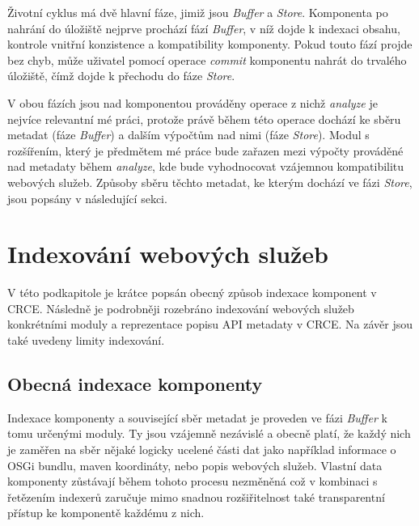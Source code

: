 \documentclass[czech,DP]{thesiskiv}
\begin{document}
Životní cyklus má dvě hlavní fáze, jimiž jsou \textit{Buffer} a \textit{Store}. Komponenta po nahrání do úložiště nejprve prochází fází \textit{Buffer}, v níž dojde k indexaci obsahu, kontrole vnitřní konzistence a kompatibility komponenty. Pokud touto fází projde bez chyb, může uživatel pomocí operace \textit{commit} komponentu nahrát do trvalého úložiště, čímž dojde k přechodu  do fáze \textit{Store}.

V obou fázích jsou nad komponentou prováděny operace z nichž \textit{analyze} je nejvíce relevantní mé práci, protože právě během této operace dochází ke sběru metadat (fáze \textit{Buffer}) a dalším výpočtům nad nimi (fáze \textit{Store}). Modul s rozšířením, který je předmětem mé práce bude zařazen mezi výpočty prováděné nad metadaty během \textit{analyze}, kde bude vyhodnocovat vzájemnou kompatibilitu webových služeb. Způsoby sběru těchto metadat, ke kterým dochází ve fázi \textit{Store}, jsou popsány v následující sekci. 

%
%
%
%
%
%
%

\section{Indexování webových služeb}
\label{sec:api-index}

V této podkapitole je krátce popsán obecný způsob indexace komponent v CRCE. Následně je podrobněji rozebráno indexování webových služeb konkrétními moduly a reprezentace popisu API metadaty v CRCE. Na závěr jsou také uvedeny limity indexování.


\subsection{Obecná indexace komponenty}

Indexace komponenty a související sběr metadat je proveden ve fázi \textit{Buffer} k tomu určenými moduly. Ty jsou vzájemně nezávislé a obecně platí, že každý nich je zaměřen na sběr nějaké logicky ucelené části dat jako například informace o OSGi bundlu, maven koordináty, nebo popis webových služeb. Vlastní data komponenty zůstávají během tohoto procesu nezměněná což v kombinaci s řetězením indexerů zaručuje mimo snadnou rozšiřitelnost také transparentní přístup ke komponentě každému z nich. 
\end{document}

